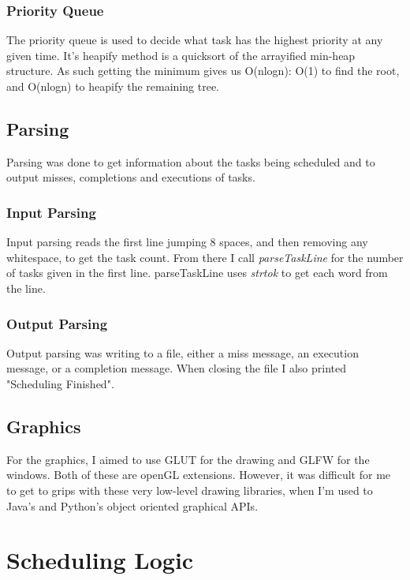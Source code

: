 \documentclass{article}
\begin{document}
    \subsubsection{Priority Queue}
    The priority queue is used to decide what task has the highest priority at any given time. \newline
    It's heapify method is a quicksort of the arrayified min-heap structure. \newline
    As such getting the minimum gives us O(nlogn): O(1) to find the root, and O(nlogn) to heapify the remaining tree. 
    \subsection{Parsing}
    Parsing was done to get information about the tasks being scheduled and to output misses, completions and executions of tasks.
    \subsubsection{Input Parsing}
    Input parsing reads the first line jumping 8 spaces, and then removing any whitespace, to get the task count. \newline
    From there I call \textit{parseTaskLine} for the number of tasks given in the first line. \newline
    parseTaskLine uses \textit{strtok} to get each word from the line. 
    \subsubsection{Output Parsing}
    Output parsing was writing to a file, either a miss message, an execution message, or a completion message. \newline
    When closing the file I also printed "Scheduling Finished".
    \subsection{Graphics}
    For the graphics, I aimed to use GLUT for the drawing and GLFW for the windows. Both of these are openGL extensions. \newline
    However, it was difficult for me to get to grips with these very low-level drawing libraries, when I'm used to Java's and Python's object oriented graphical APIs. \newline
    \section{Scheduling Logic}
\end{document}
